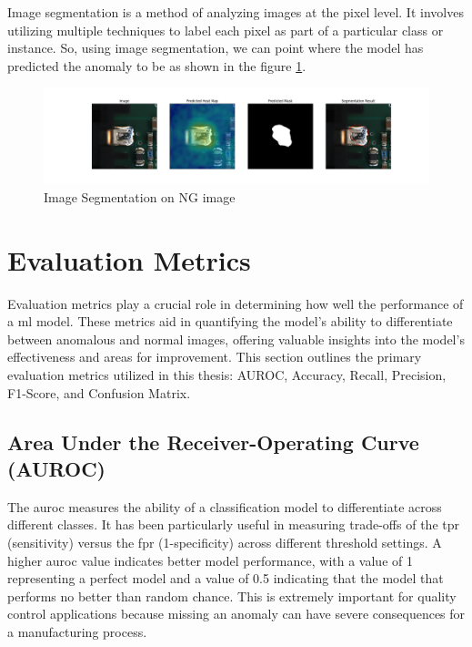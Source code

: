 Image segmentation is a method of analyzing images at the pixel level. It involves utilizing multiple techniques to label each pixel as part of a particular class or instance\cite{IBM2024}. So, using image segmentation, we can point where the model has predicted the anomaly to be as shown in the figure \ref{fig:Image Segmentation on NG image}.

\begin{figure}[ht!]
    \centering
    \includegraphics[width=1\linewidth]{Images/anomalous_image_segmentation.jpg}
    \caption{Image Segmentation on NG image}
    \label{fig:Image Segmentation on NG image}
\end{figure}

\section{Evaluation Metrics}
\label{subsec:Evaluation Metrics}

Evaluation metrics play a crucial role in determining how well the performance of a \gls{ml} model. These metrics aid in quantifying the model's ability to differentiate between anomalous and normal images, offering valuable insights into the model's effectiveness and areas for improvement. This section outlines the primary evaluation metrics utilized in this thesis: AUROC, Accuracy, Recall, Precision, F1-Score, and Confusion Matrix.

\subsection*{Area Under the Receiver-Operating Curve (AUROC)}
\label{subsec:AUROC}

The \gls{auroc} measures the ability of a classification model to differentiate across different classes. It has been particularly useful in measuring trade-offs of the \gls{tpr} (sensitivity) versus the \gls{fpr} (1-specificity) across different threshold settings. A higher \gls{auroc} value indicates better model performance, with a value of 1 representing a perfect model and a value of 0.5 indicating that the model that performs no better than random chance\cite{FAWCETT2006861}. This is extremely important for quality control applications because missing an anomaly can have severe consequences for a manufacturing process. %

